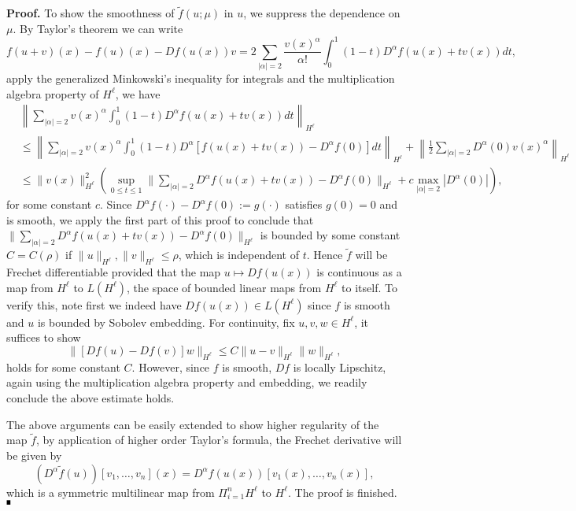 \documentclass[letterpaper,11pt]{article}
\numberwithin{equation}{section}
\theoremstyle{plain}
\theoremstyle{remark}
\newenvironment{Proof}[1][.]%
 {\begin{trivlist}\item[]\textbf{Proof#1 }}%
 {\hspace*{\fill}$\rule{0.3\baselineskip}{0.35\baselineskip}$\end{trivlist}}
\begin{document}
\begin{Proof}
To show the smoothness of $\tilde{f}(u;\mu)$ in $u$, we suppress the dependence on $\mu$. By Taylor's theorem we can write
\[
f(u+v)(x) - f(u)(x)-Df(u(x))v  = 2\sum_{|\alpha|=2} \frac{v(x)^\alpha}{\alpha!} \int_0^1 (1-t) D^\alpha f(u(x)+tv(x))dt,
\]
apply the generalized Minkowski's inequality for integrals and the multiplication algebra property of $H^\ell$, we have
\begin{align*}
&\left\|\sum_{|\alpha|=2} v(x)^\alpha \int_0^1 (1-t) D^\alpha f(u(x)+tv(x))dt \right\|_{H^\ell}\\
 &\le \left\|\sum_{|\alpha|=2} v(x)^\alpha \int_0^1 (1-t)D^\alpha [f(u(x)+tv(x))-D^\alpha f(0)]dt\right\|_{H^\ell} + \left \|\frac{1}{2}\sum_{|\alpha|=2} D^\alpha(0) v(x)^\alpha \right\|_{H^\ell} \\
 &\le \| v(x) \|^2_{H^\ell}\left(\sup_{0\le t\le 1}\|\sum_{|\alpha|=2}D^\alpha f(u(x)+tv(x))-D^\alpha f(0)\|_{H^\ell} + c\max_{|\alpha|=2}|D^\alpha(0)|\right),
\end{align*}
for some constant $c$. Since $D^\alpha f(\cdot)-D^\alpha f(0):= g(\cdot)$ satisfies $g(0) = 0$ and is smooth, we apply the first part of this proof to conclude that $\|\sum_{|\alpha|=2}D^\alpha f(u(x)+tv(x))-D^\alpha f(0)\|_{H^\ell}$ is bounded by some constant $C=C(\rho)$ if $\|u\|_{H^\ell},\|v\|_{H^\ell} \le \rho$, which is independent of $t$. Hence $\tilde{f}$ will be Frechet differentiable provided that the map $u \mapsto Df(u(x))$ is continuous as a map from $H^\ell$ to $L(H^\ell)$, the space of bounded linear maps from $H^\ell$ to itself. To verify this, note first we indeed have $Df(u(x)) \in L(H^\ell)$ since $f$ is smooth and $u$ is bounded by Sobolev embedding. For continuity, fix $u,v,w \in H^\ell$, it suffices to show
\[
\|[Df(u)-Df(v)]w \|_{H^\ell} \le C\|u-v\|_{H^\ell}\|w\|_{H^\ell},
\]
holds for some constant $C$. However, since $f$ is smooth, $Df$ is locally Lipschitz, again using the multiplication algebra property and embedding, we readily conclude the above estimate holds.

The above arguments can be easily extended to show higher regularity of the map $\tilde{f}$, by application of higher order Taylor's formula, the Frechet derivative will be given by 
\[
\left( D^\alpha \tilde{f}(u) \right)[v_1,\ldots,v_n] (x)= D^\alpha f(u(x)) [v_1(x),\ldots,v_n(x)],
\]
which is a symmetric multilinear map from $\displaystyle \Pi_{i=1}^n H^\ell $ to $H^\ell$. The proof is finished.
\end{Proof}
\end{document}
